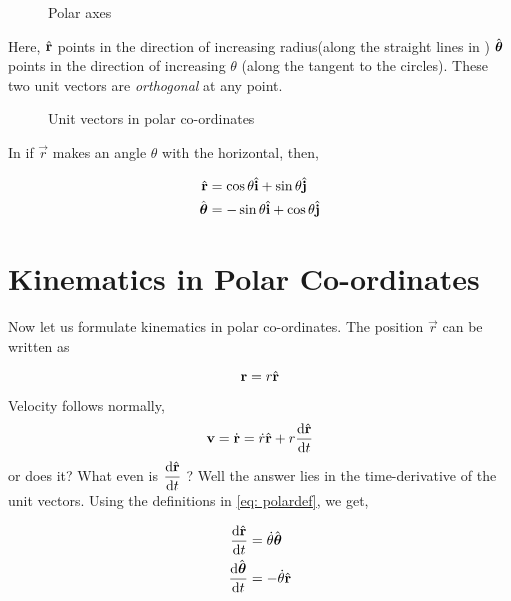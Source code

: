 \begin{figure}
    [H]
    \centering
    \caption{Polar axes}
    \label{fig: polar}
\end{figure}

Here, \({\hat{\boldsymbol{\mathbf{r}}}}\) points in the direction of increasing radius(along the straight lines in )
\({\hat{\boldsymbol{\mathbf{\theta}}}}\) points in the direction of increasing \(\theta\) (along the tangent to the circles).
These two unit vectors are \emph{orthogonal} at any point. 

\begin{figure}
    [H]
    \centering
    \caption{Unit vectors in polar co-ordinates}
    \label{fig: polarunit}
\end{figure}

\noindent In  if \(\vec{r}\) makes
an angle \(\theta\) with the horizontal, then,

\begin{align}
    \label{eq: polardef}
    {\hat{\boldsymbol{\mathbf{r}}}} &= \cos \theta {\hat{\boldsymbol{\mathbf{i}}}} + \sin \theta {\hat{\boldsymbol{\mathbf{j}}}}\\
    {\hat{\boldsymbol{\mathbf{\theta}}}} &= -\sin \theta {\hat{\boldsymbol{\mathbf{i}}}} + \cos \theta {\hat{\boldsymbol{\mathbf{j}}}}
\end{align}

\section{Kinematics in Polar Co-ordinates}

Now let us formulate kinematics in polar co-ordinates. The position \(\vec{r}\) can be written as

\begin{equation}
    \boldsymbol{\mathbf{r}} = r {\hat{\boldsymbol{\mathbf{r}}}}
\end{equation}

\noindent Velocity follows normally, 
\begin{equation}
    \boldsymbol{\mathbf{v}} = \dot{\boldsymbol{\mathbf{r}}} = \dot{r} {\hat{\boldsymbol{\mathbf{r}}}} + r\dv{{\hat{\boldsymbol{\mathbf{r}}}}}{t} 
\end{equation}
or does it? What even is \(\displaystyle\dv{{\hat{\boldsymbol{\mathbf{r}}}}}{t}\) ? Well the answer lies in 
the time-derivative of the unit vectors. Using the definitions in \eqref{eq: polardef}, we get,

\begin{align}
    \dv{{\hat{\boldsymbol{\mathbf{r}}}}}{t} &= \dot{\theta} {\hat{\boldsymbol{\mathbf{\theta}}}}\\
    \dv{{\hat{\boldsymbol{\mathbf{\theta}}}}}{t} &= -\dot{\theta} {\hat{\boldsymbol{\mathbf{r}}}}
\end{align}

